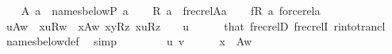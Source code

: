 \begin{isabellebody}
\ \ \isamarkupfalse%
\ {\isacharquery}{\kern0pt}A{\isacharequal}{\kern0pt}{\isachardoublequoteopen}{\isasymlambda}\ a\ {\isachardot}{\kern0pt}\ names{\isacharunderscore}{\kern0pt}below{\isacharparenleft}{\kern0pt}P{\isacharcomma}{\kern0pt}\ a{\isacharparenright}{\kern0pt}{\isachardoublequoteclose}\isanewline
\ \ \isamarkupfalse%
\ {\isacharquery}{\kern0pt}R{\isacharequal}{\kern0pt}{\isachardoublequoteopen}{\isasymlambda}\ a\ {\isachardot}{\kern0pt}\ frecrel{\isacharparenleft}{\kern0pt}{\isacharquery}{\kern0pt}A{\isacharparenleft}{\kern0pt}a{\isacharparenright}{\kern0pt}{\isacharparenright}{\kern0pt}{\isachardoublequoteclose}\isanewline
\ \ \isamarkupfalse%
\ {\isacharquery}{\kern0pt}fR{\isacharequal}{\kern0pt}{\isachardoublequoteopen}{\isasymlambda}\ a\ {\isachardot}{\kern0pt}forcerel{\isacharparenleft}{\kern0pt}a{\isacharparenright}{\kern0pt}{\isachardoublequoteclose}\isanewline
\ \ \isamarkupfalse%
\ {\isachardoublequoteopen}u{\isasymin}{\isacharquery}{\kern0pt}A{\isacharparenleft}{\kern0pt}w{\isacharparenright}{\kern0pt}\ {\isasymlongrightarrow}\ {\isasymlangle}x{\isacharcomma}{\kern0pt}u{\isasymrangle}{\isasymin}{\isacharquery}{\kern0pt}R{\isacharparenleft}{\kern0pt}w{\isacharparenright}{\kern0pt}{\isacharcircum}{\kern0pt}{\isacharplus}{\kern0pt}{\isachardoublequoteclose}\ \ {\isachardoublequoteopen}x{\isasymin}{\isacharquery}{\kern0pt}A{\isacharparenleft}{\kern0pt}w{\isacharparenright}{\kern0pt}{\isachardoublequoteclose}\ {\isachardoublequoteopen}{\isasymlangle}x{\isacharcomma}{\kern0pt}y{\isasymrangle}{\isasymin}{\isacharquery}{\kern0pt}R{\isacharparenleft}{\kern0pt}z{\isacharparenright}{\kern0pt}{\isacharcircum}{\kern0pt}{\isacharplus}{\kern0pt}{\isachardoublequoteclose}\ {\isachardoublequoteopen}{\isasymlangle}x{\isacharcomma}{\kern0pt}u{\isasymrangle}{\isasymin}{\isacharquery}{\kern0pt}R{\isacharparenleft}{\kern0pt}z{\isacharparenright}{\kern0pt}{\isachardoublequoteclose}\ \ \ \ u\isanewline
\ \ \ \ \isamarkupfalse%
\ that\ frecrelD\ frecrelI\ r{\isacharunderscore}{\kern0pt}into{\isacharunderscore}{\kern0pt}trancl\ \isamarkupfalse%
\ names{\isacharunderscore}{\kern0pt}below{\isacharunderscore}{\kern0pt}def\ \isamarkupfalse%
\ simp\isanewline
\ \ \isacommand{{\isacharbraceleft}{\kern0pt}}\isamarkupfalse%
\isanewline
\ \ \ \ \isamarkupfalse%
\ u\ v\isanewline
\ \ \ \ \isamarkupfalse%
\ {\isachardoublequoteopen}x\ {\isasymin}\ {\isacharquery}{\kern0pt}A{\isacharparenleft}{\kern0pt}w{\isacharparenright}{\kern0pt}{\isachardoublequoteclose}\isanewline

\end{isabellebody}
